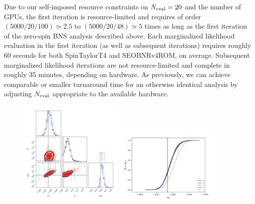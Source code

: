 \documentclass[twocolumn,prd,nofootinbib]{revtex4}
\begin{document}
Due to our self-imposed resource constraints on $N_{\rm eval}=20$ and the number of GPUs, the first iteration is
resource-limited and requires
of order $(5000/20/100)\simeq
2.5$ to $(5000/20/48)\simeq
 5$ times as long as the first iteration of the zero-spin BNS analysis described above.  Each marginalized likelihood
 evaluation in the first iteration (as well as subsequent iterations) requires roughly 60 seconds for both SpinTaylorT4 and SEOBNRv4ROM, on average.   Subsequent
marginalized likelihood iterations are not resource-limited and complete in roughly 35 minutes, depending on hardware.
As previously, we can achieve comparable or smaller turnaround time for an otherwise identical analysis by adjusting $N_{\rm eval}$ appropriate to the available hardware.


\begin{figure}
\includegraphics[width=0.45\textwidth]{figures/bns_withspin_corner_mc_delta_xi.png}
\includegraphics[width=0.45\textwidth]{figures/bns_withspin_mc_cum.png}

\end{figure}
\end{document}
